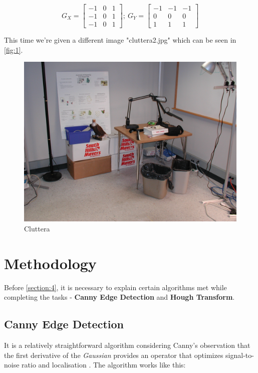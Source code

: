\documentclass[lettersize,journal]{IEEEtran}
\begin{document}
\begin{equation}\label{eq:1}
    G_X = \begin{bmatrix}-1 & 0 & 1 \\ -1 & 0 & 1 \\ -1 & 0 & 1\end{bmatrix};\ 
    G_Y = \begin{bmatrix}-1 & -1 & -1 \\ 0 & 0 & 0 \\ 1 & 1 & 1\end{bmatrix}
\end{equation}

This time we're given a different image "cluttera2.jpg" which can be seen in \autoref{fig:1}.

\begin{figure}[h]
    \centering
    \includegraphics[width=0.55\linewidth]{cluttera2}
    \caption{Cluttera}
    \label{fig:1}
\end{figure}

\section{Methodology}

Before \autoref{section:4}, it is necessary to explain certain algorithms met while completing the tasks - \textbf{Canny Edge Detection} and \textbf{Hough Transform}.

\subsection{Canny Edge Detection}

It is a relatively straightforward algorithm considering Canny's observation that the first derivative of the \emph{Gaussian} provides an operator that optimizes signal-to-noise ratio and localisation \cite{ref1}. The algorithm works like this:

\hfill
\end{document}
